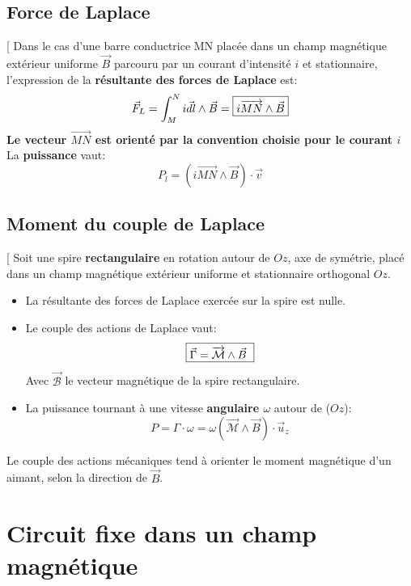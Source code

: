 \documentclass[12pt,hidelinks]{article}
\begin{document}
    \subsection{Force de Laplace}
    \begin{DashedDefinition}{}[
        Dans le cas d'une barre conductrice MN placée dans un champ magnétique extérieur uniforme $\vec B$ parcouru par un courant d'intensité $i$ et stationnaire, l'expression de la \textbf{résultante des forces de Laplace} est:
        \[\vec F_L = \int_M^N i \vec{dl} \wedge \vec B = \fbox{$i \overrightarrow{MN} \wedge \vec B$}\]
        \textbf{Le vecteur $\overrightarrow{MN}$ est orienté par la convention choisie pour le courant $i$} \\
        La \textbf{puissance} vaut:
        \[P_l=(i\overrightarrow{MN} \wedge \vec B) \cdot \vec v\]
    \end{DashedDefinition}

    \subsection{Moment du couple de Laplace}
        \begin{DashedDefinition}{}[
            Soit une spire \textbf{rectangulaire} en rotation autour de $Oz$, axe de symétrie, placé dans un champ magnétique extérieur uniforme et stationnaire orthogonal $Oz$.
            \begin{itemize}
                \item La résultante des forces de Laplace exercée sur la spire est nulle.
                \item Le couple des actions de Laplace vaut:
                \[ \fbox{$ \vec \Gamma = \overrightarrow{\mathcal{M}} \wedge \vec B $ }\]
                Avec $\overrightarrow{\mathcal{B}}$ le vecteur magnétique de la spire rectangulaire.
                \item La puissance tournant à une vitesse \textbf{angulaire $\omega$} autour de ($Oz$):
                \[P= \Gamma \cdot \omega = \omega (\overrightarrow{\mathcal{M}} \wedge \vec B)\cdot \vec u_z\]
            \end{itemize}
        \end{DashedDefinition}
        Le couple des actions mécaniques tend à orienter le moment magnétique d'un aimant, selon la direction de $\vec B$.
\newpage
\section{Circuit fixe dans un champ magnétique}
\vspace{3cm}
\end{document}
